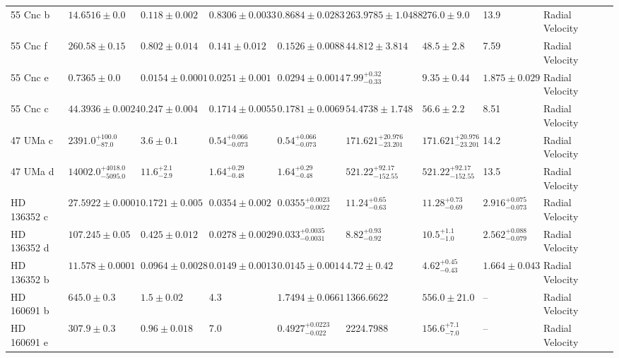 \begin{tabular}{llllllllll}
55 Cnc b & $14.6516 \pm 0.0$ & $0.118 \pm 0.002$ & $0.8306 \pm 0.0033$ & $0.8684 \pm 0.0283$ & $263.9785 \pm 1.0488$ & $276.0 \pm 9.0$ & 13.9 & Radial Velocity & \cite{MOUTOU_ET_AL_2026} \\
55 Cnc f & $260.58 \pm 0.15$ & $0.802 \pm 0.014$ & $0.141 \pm 0.012$ & $0.1526 \pm 0.0088$ & $44.812 \pm 3.814$ & $48.5 \pm 2.8$ & 7.59 & Radial Velocity & \cite{MOUTOU_ET_AL_2026} \\
55 Cnc e & $0.7365 \pm 0.0$ & $0.0154 \pm 0.0001$ & $0.0251 \pm 0.001$ & $0.0294 \pm 0.0014$ & $7.99^{+0.32}_{-0.33}$ & $9.35 \pm 0.44$ & $1.875 \pm 0.029$ & Radial Velocity & \cite{BOURRIER_ET_AL__2018} \\
55 Cnc c & $44.3936 \pm 0.0024$ & $0.247 \pm 0.004$ & $0.1714 \pm 0.0055$ & $0.1781 \pm 0.0069$ & $54.4738 \pm 1.748$ & $56.6 \pm 2.2$ & 8.51 & Radial Velocity & \cite{MOUTOU_ET_AL_2026} \\
47 UMa c & $2391.0^{+100.0}_{-87.0}$ & $3.6 \pm 0.1$ & $0.54^{+0.066}_{-0.073}$ & $0.54^{+0.066}_{-0.073}$ & $171.621^{+20.976}_{-23.201}$ & $171.621^{+20.976}_{-23.201}$ & 14.2 & Radial Velocity & \cite{GREGORY___FISCHER_2010} \\
47 UMa d & $14002.0^{+4018.0}_{-5095.0}$ & $11.6^{+2.1}_{-2.9}$ & $1.64^{+0.29}_{-0.48}$ & $1.64^{+0.29}_{-0.48}$ & $521.22^{+92.17}_{-152.55}$ & $521.22^{+92.17}_{-152.55}$ & 13.5 & Radial Velocity & \cite{GREGORY___FISCHER_2010} \\
HD 136352 c & $27.5922 \pm 0.0001$ & $0.1721 \pm 0.005$ & $0.0354 \pm 0.002$ & $0.0355^{+0.0023}_{-0.0022}$ & $11.24^{+0.65}_{-0.63}$ & $11.28^{+0.73}_{-0.69}$ & $2.916^{+0.075}_{-0.073}$ & Radial Velocity & \cite{DELREZ_ET_AL_2021} \\
HD 136352 d & $107.245 \pm 0.05$ & $0.425 \pm 0.012$ & $0.0278 \pm 0.0029$ & $0.033^{+0.0035}_{-0.0031}$ & $8.82^{+0.93}_{-0.92}$ & $10.5^{+1.1}_{-1.0}$ & $2.562^{+0.088}_{-0.079}$ & Radial Velocity & \cite{DELREZ_ET_AL_2021} \\
HD 136352 b & $11.578 \pm 0.0001$ & $0.0964 \pm 0.0028$ & $0.0149 \pm 0.0013$ & $0.0145 \pm 0.0014$ & $4.72 \pm 0.42$ & $4.62^{+0.45}_{-0.43}$ & $1.664 \pm 0.043$ & Radial Velocity & \cite{DELREZ_ET_AL_2021} \\
HD 160691 b & $645.0 \pm 0.3$ & $1.5 \pm 0.02$ & 4.3 & $1.7494 \pm 0.0661$ & 1366.6622 & $556.0 \pm 21.0$ & -- & Radial Velocity & \cite{BENEDICT_ET_AL__2022} \\
HD 160691 e & $307.9 \pm 0.3$ & $0.96 \pm 0.018$ & 7.0 & $0.4927^{+0.0223}_{-0.022}$ & 2224.7988 & $156.6^{+7.1}_{-7.0}$ & -- & Radial Velocity & \cite{BENEDICT_ET_AL__2022} \\

\end{tabular}
